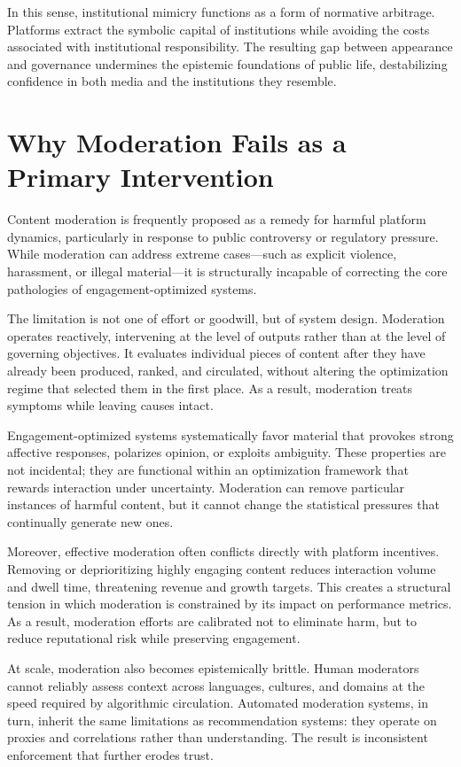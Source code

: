 \documentclass[12pt]{article}
\begin{document}
In this sense, institutional mimicry functions as a form of normative arbitrage. Platforms extract the symbolic capital of institutions while avoiding the costs associated with institutional responsibility. The resulting gap between appearance and governance undermines the epistemic foundations of public life, destabilizing confidence in both media and the institutions they resemble.

\section{Why Moderation Fails as a Primary Intervention}

Content moderation is frequently proposed as a remedy for harmful platform dynamics, particularly in response to public controversy or regulatory pressure. While moderation can address extreme cases—such as explicit violence, harassment, or illegal material—it is structurally incapable of correcting the core pathologies of engagement-optimized systems.

The limitation is not one of effort or goodwill, but of system design. Moderation operates reactively, intervening at the level of outputs rather than at the level of governing objectives. It evaluates individual pieces of content after they have already been produced, ranked, and circulated, without altering the optimization regime that selected them in the first place. As a result, moderation treats symptoms while leaving causes intact.

Engagement-optimized systems systematically favor material that provokes strong affective responses, polarizes opinion, or exploits ambiguity. These properties are not incidental; they are functional within an optimization framework that rewards interaction under uncertainty. Moderation can remove particular instances of harmful content, but it cannot change the statistical pressures that continually generate new ones.

Moreover, effective moderation often conflicts directly with platform incentives. Removing or deprioritizing highly engaging content reduces interaction volume and dwell time, threatening revenue and growth targets. This creates a structural tension in which moderation is constrained by its impact on performance metrics. As a result, moderation efforts are calibrated not to eliminate harm, but to reduce reputational risk while preserving engagement.

At scale, moderation also becomes epistemically brittle. Human moderators cannot reliably assess context across languages, cultures, and domains at the speed required by algorithmic circulation. Automated moderation systems, in turn, inherit the same limitations as recommendation systems: they operate on proxies and correlations rather than understanding. The result is inconsistent enforcement that further erodes trust.
\end{document}
